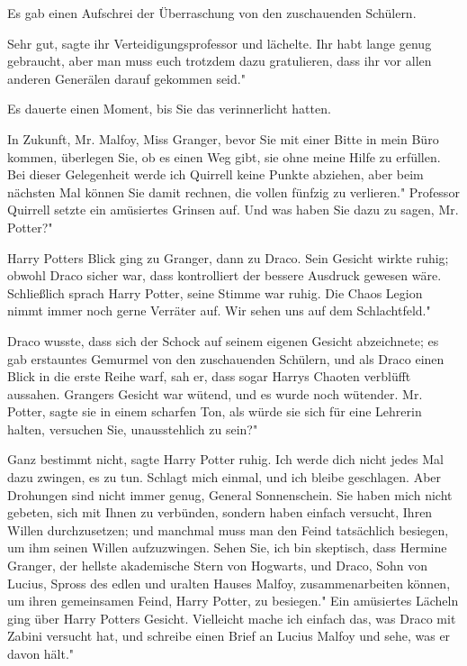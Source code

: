 Es gab einen Aufschrei der Überraschung von den zuschauenden Schülern.

\glqq{}Sehr gut\grqq{}, sagte ihr Verteidigungsprofessor und lächelte. \glqq{}Ihr
habt lange genug gebraucht, aber man muss euch trotzdem dazu gratulieren, dass
ihr vor allen anderen Generälen darauf gekommen seid."

Es dauerte einen Moment, bis Sie das verinnerlicht hatten.

\glqq{}In Zukunft, Mr. Malfoy, Miss Granger, bevor Sie mit einer Bitte in mein
Büro kommen, überlegen Sie, ob es einen Weg gibt, sie ohne meine Hilfe zu
erfüllen. Bei dieser Gelegenheit werde ich Quirrell keine Punkte abziehen, aber
beim nächsten Mal können Sie damit rechnen, die vollen fünfzig zu verlieren."
Professor Quirrell setzte ein amüsiertes Grinsen auf. \glqq{}Und was haben Sie
dazu zu sagen, Mr. Potter?"

Harry Potters Blick ging zu Granger, dann zu Draco. Sein Gesicht wirkte ruhig;
obwohl Draco sicher war, dass kontrolliert der bessere Ausdruck gewesen wäre.
Schließlich sprach Harry Potter, seine Stimme war ruhig. \glqq{}Die Chaos Legion
nimmt immer noch gerne Verräter auf. Wir sehen uns auf dem Schlachtfeld."

Draco wusste, dass sich der Schock auf seinem eigenen Gesicht abzeichnete; es
gab erstauntes Gemurmel von den zuschauenden Schülern, und als Draco einen Blick
in die erste Reihe warf, sah er, dass sogar Harrys Chaoten verblüfft aussahen.
Grangers Gesicht war wütend, und es wurde noch wütender. \glqq{}Mr.
Potter\grqq{}, sagte sie in einem scharfen Ton, als würde sie sich für eine
Lehrerin halten, \glqq{}versuchen Sie, unausstehlich zu sein?"

\glqq{}Ganz bestimmt nicht\grqq{}, sagte Harry Potter ruhig. \glqq{}Ich werde dich
nicht jedes Mal dazu zwingen, es zu tun. Schlagt mich einmal, und ich bleibe
geschlagen. Aber Drohungen sind nicht immer genug, General Sonnenschein. Sie
haben mich nicht gebeten, sich mit Ihnen zu verbünden, sondern haben einfach
versucht, Ihren Willen durchzusetzen; und manchmal muss man den Feind
tatsächlich besiegen, um ihm seinen Willen aufzuzwingen. Sehen Sie, ich bin
skeptisch, dass Hermine Granger, der hellste akademische Stern von Hogwarts, und
Draco, Sohn von Lucius, Spross des edlen und uralten Hauses Malfoy,
zusammenarbeiten können, um ihren gemeinsamen Feind, Harry Potter, zu besiegen."
Ein amüsiertes Lächeln ging über Harry Potters Gesicht. \glqq{}Vielleicht mache
ich einfach das, was Draco mit Zabini versucht hat, und schreibe einen Brief an
Lucius Malfoy und sehe, was er davon hält."

